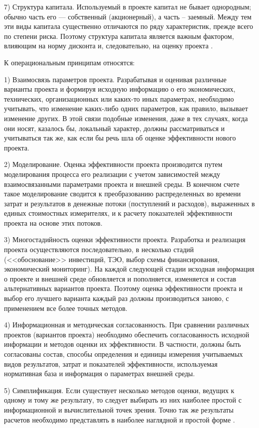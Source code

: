 7) Структура капитала.
Используемый в проекте капитал не бывает однородным; обычно часть его --- собственный (акционерный), а часть -- заемный.
Между тем эти виды капитала существенно отличаются по ряду характеристик, прежде всего по степени риска.
Поэтому структура капитала является важным фактором, влияющим на норму дисконта и, следовательно, на оценку проекта \cite[279]{golovan}.

К операциональным принципам относятся:

1) Взаимосвязь параметров проекта.
Разрабатывая и оценивая различные варианты проекта и формируя исходную информацию о его экономических, технических, организационных или каких-то иных параметрах, необходимо учитывать, что изменение каких-либо одних параметров, как правило, вызывает изменение других.
В этой связи подобные изменения, даже в тех случаях, когда они носят, казалось бы, локальный характер, должны рассматриваться и учитываться так же, как если бы речь шла об оценке эффективности нового проекта.

2) Моделирование.
Оценка эффективности проекта производится путем моделирования процесса его реализации с учетом зависимостей между взаимосвязанными параметрами проекта и внешней среды.
В конечном счете такое моделирование сводится к преобразованию распределенных во времени затрат и результатов в денежные потоки (поступлений и расходов), выраженных в единых стоимостных измерителях, и к расчету показателей эффективности проекта на основе этих потоков.

3) Многостадийность оценки эффективности проекта.
Разработка и реализация проекта осуществляются последовательно, в несколько стадий (<<обоснование>> инвестиций, ТЭО, выбор схемы финансирования, экономический мониторинг).
На каждой следующей стадии исходная информация о проекте и внешней среде обновляется и пополняется, изменяется и состав альтернативных вариантов проекта.
Поэтому оценка эффективности проекта и выбор его лучшего варианта каждый раз должны производиться заново, с применением все более точных методов. 

4) Информационная и методическая согласованность.
При сравнении различных проектов (вариантов проекта) необходимо обеспечить согласованность исходной информации и методов оценки их эффективности.
В частности, должны быть согласованы состав, способы определения и единицы измерения учитываемых видов результатов, затрат и показателей эффективности, используемая нормативная база и информация о параметрах внешней среды.

5) Симплификация.
Если существует несколько методов оценки, ведущих к одному и тому же результату, то следует выбирать из них наиболее простой с информационной и вычислительной точек зрения.
Точно так же результаты расчетов необходимо представлять в наиболее наглядной и простой форме \cite[281]{golovan}.

